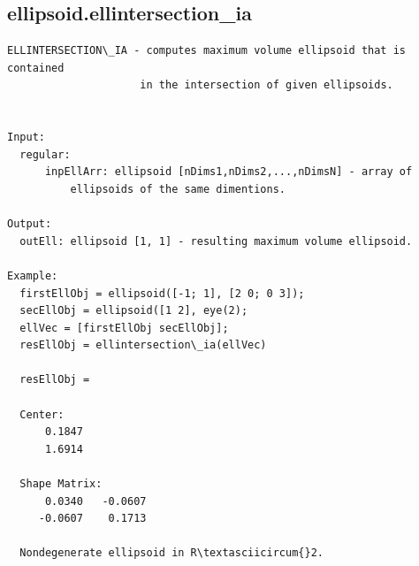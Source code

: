 \documentclass[letterpaper,10pt,english]{sphinxmanual}
\begin{document}
\subsection{ellipsoid.ellintersection\_ia}
\label{chap_functions:ellipsoid-ellintersection-ia}
\begin{Verbatim}[commandchars=\\\{\}]
ELLINTERSECTION\_IA - computes maximum volume ellipsoid that is contained
                     in the intersection of given ellipsoids.


Input:
  regular:
      inpEllArr: ellipsoid [nDims1,nDims2,...,nDimsN] - array of
          ellipsoids of the same dimentions.

Output:
  outEll: ellipsoid [1, 1] - resulting maximum volume ellipsoid.

Example:
  firstEllObj = ellipsoid([-1; 1], [2 0; 0 3]);
  secEllObj = ellipsoid([1 2], eye(2);
  ellVec = [firstEllObj secEllObj];
  resEllObj = ellintersection\_ia(ellVec)

  resEllObj =

  Center:
      0.1847
      1.6914

  Shape Matrix:
      0.0340   -0.0607
     -0.0607    0.1713

  Nondegenerate ellipsoid in R\textasciicircum{}2.
\end{Verbatim}
\end{document}
